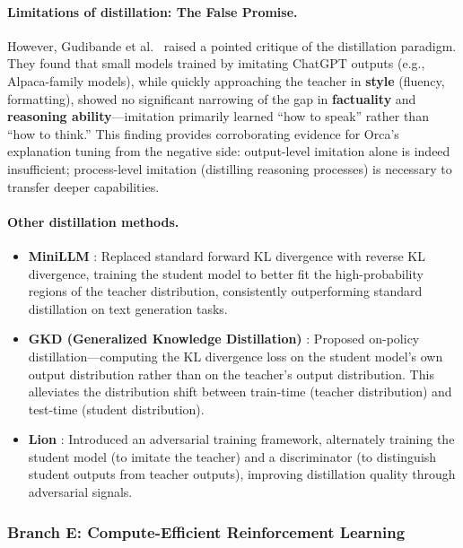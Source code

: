 \paragraph{Limitations of distillation: The False Promise.}
However, Gudibande et al.\ \cite{gudibande2023false} raised a pointed critique of the distillation paradigm.
They found that small models trained by imitating ChatGPT outputs (e.g., Alpaca-family models),
while quickly approaching the teacher in \textbf{style} (fluency, formatting),
showed no significant narrowing of the gap in \textbf{factuality} and \textbf{reasoning ability}---imitation primarily learned ``how to speak'' rather than ``how to think.''
This finding provides corroborating evidence for Orca's explanation tuning from the negative side:
output-level imitation alone is indeed insufficient;
process-level imitation (distilling reasoning processes) is necessary to transfer deeper capabilities.

\paragraph{Other distillation methods.}
\begin{itemize}[leftmargin=2em]
  \item \textbf{MiniLLM} \cite{gu2023minillm}:
    Replaced standard forward KL divergence with reverse KL divergence,
    training the student model to better fit the high-probability regions of the teacher distribution,
    consistently outperforming standard distillation on text generation tasks.

  \item \textbf{GKD (Generalized Knowledge Distillation)} \cite{agarwal2023gkd}:
    Proposed on-policy distillation---computing the KL divergence loss on the student model's own output distribution
    rather than on the teacher's output distribution.
    This alleviates the distribution shift between train-time (teacher distribution) and test-time (student distribution).

  \item \textbf{Lion} \cite{jiang2023lion}:
    Introduced an adversarial training framework,
    alternately training the student model (to imitate the teacher) and
    a discriminator (to distinguish student outputs from teacher outputs),
    improving distillation quality through adversarial signals.
\end{itemize}

\subsubsection{Branch E: Compute-Efficient Reinforcement Learning}
\label{sec:t7-compute-rl}

